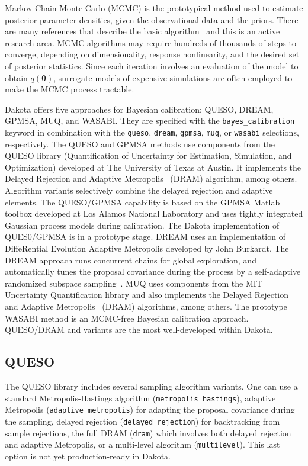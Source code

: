 Markov Chain Monte Carlo (MCMC) is the prototypical method used to
estimate posterior parameter densities, given the observational data
and the priors. There are many references that describe the basic
algorithm~\cite{Gilks} and this is an active research area.  MCMC
algorithms may require hundreds of thousands of steps to converge,
depending on dimensionality, response nonlinearity, and the desired
set of posterior statistics.  Since each iteration involves an
evaluation of the model to obtain $q(\boldsymbol{\theta})$, surrogate
models of expensive simulations are often employed to make the MCMC
process tractable.
 
Dakota offers five approaches for Bayesian calibration: QUESO, DREAM,
GPMSA, MUQ, and WASABI.  They are specified with the
\texttt{bayes\_calibration} keyword in combination with the
\texttt{queso}, \texttt{dream}, \texttt{gpmsa}, \texttt{muq}, or \texttt{wasabi}
selections, respectively.  The QUESO and GPMSA methods use components
from the QUESO library (Quantification of Uncertainty for Estimation,
Simulation, and Optimization) developed at The University of Texas at
Austin.  It implements the Delayed Rejection and Adaptive
Metropolis~\cite{Haario} (DRAM) algorithm, among others.  Algorithm
variants selectively combine the delayed rejection and adaptive
elements.  The QUESO/GPMSA capability is based on the GPMSA Matlab
toolbox developed at Los Alamos National Laboratory and uses tightly
integrated Gaussian process models during calibration.  The Dakota
implementation of QUES0/GPMSA is in a prototype stage.  DREAM uses an
implementation of DiffeRential Evolution Adaptive Metropolis developed
by John Burkardt.  The DREAM approach runs concurrent chains for
global exploration, and automatically tunes the proposal covariance
during the process by a self-adaptive randomized subspace
sampling~\cite{Vrugt}. MUQ uses components from the MIT 
Uncertainty Quantification library and also implements the Delayed Rejection
and Adaptive Metropolis~\cite{Haario} (DRAM) algorithms, among others.
The prototype WASABI method is an MCMC-free Bayesian calibration
approach.  QUESO/DRAM and variants are the most well-developed within
Dakota.

\subsection{QUESO}\label{uq:bayesian:queso}
The QUESO library includes several sampling algorithm variants.  One
can use a standard Metropolis-Hastings algorithm
(\texttt{metropolis\_hastings}), adaptive Metropolis
(\texttt{adaptive\_metropolis}) for adapting the proposal covariance
during the sampling, delayed rejection (\texttt{delayed\_rejection})
for backtracking from sample rejections, the full DRAM (\texttt{dram})
which involves both delayed rejection and adaptive Metropolis, or a
multi-level algorithm (\texttt{multilevel}).  This last option is not
yet production-ready in Dakota. 

